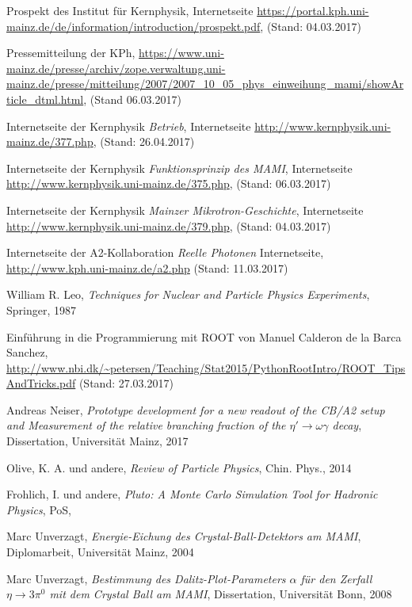 \documentclass[a4paper,11pt,oneside,final,german,openbib,pdftex]{scrbook}
\begin{document}
{\begin{appendix}
\begin{thebibliography}{99}
 Prospekt des Institut für Kernphysik, Internetseite \url{https://portal.kph.uni-mainz.de/de/information/introduction/prospekt.pdf}, (Stand: 04.03.2017)

 Pressemitteilung der KPh, \url{https://www.uni-mainz.de/presse/archiv/zope.verwaltung.uni-mainz.de/presse/mitteilung/2007/2007_10_05_phys_einweihung_mami/showArticle_dtml.html}, (Stand 06.03.2017)


 Internetseite der Kernphysik {\em Betrieb}, Internetseite \url{http://www.kernphysik.uni-mainz.de/377.php}, (Stand: 26.04.2017)


 Internetseite der Kernphysik {\em Funktionsprinzip des MAMI}, Internetseite \url{http://www.kernphysik.uni-mainz.de/375.php}, (Stand: 06.03.2017)


 Internetseite der Kernphysik {\em Mainzer Mikrotron-Geschichte}, Internetseite \url{http://www.kernphysik.uni-mainz.de/379.php}, (Stand: 04.03.2017)


 Internetseite der A2-Kollaboration {\em Reelle Photonen}
Internetseite, \url{http://www.kph.uni-mainz.de/a2.php} (Stand: 11.03.2017)


 William R. Leo, \textit{Techniques for Nuclear and Particle Physics Experiments}, Springer, 1987

 Einf\"uhrung in die Programmierung mit ROOT von Manuel Calderon de la Barca Sanchez, \url{http://www.nbi.dk/~petersen/Teaching/Stat2015/PythonRootIntro/ROOT_TipsAndTricks.pdf} (Stand: 27.03.2017)


 Andreas Neiser, {\em Prototype development for a new readout of the CB/A2 setup and Measurement of the relative branching fraction of the $\eta' \rightarrow \omega \gamma$ decay}, Dissertation, Universität Mainz, 2017

 Olive, K. A. und andere, {\em Review of Particle Physics}, Chin. Phys., 2014

 Frohlich, I. und andere, \textit{Pluto: A Monte Carlo Simulation Tool for Hadronic
	Physics}, PoS,

	
 Marc Unverzagt, {\em Energie-Eichung des Crystal-Ball-Detektors am MAMI}, Diplomarbeit, Universität Mainz, 2004

 Marc Unverzagt, {\em Bestimmung des Dalitz-Plot-Parameters $\alpha$ für den Zerfall $ \eta \rightarrow 3\pi^{0} $ mit dem Crystal Ball am MAMI}, Dissertation, Universität Bonn, 2008


\end{thebibliography}
\end{appendix}}
\end{document}
